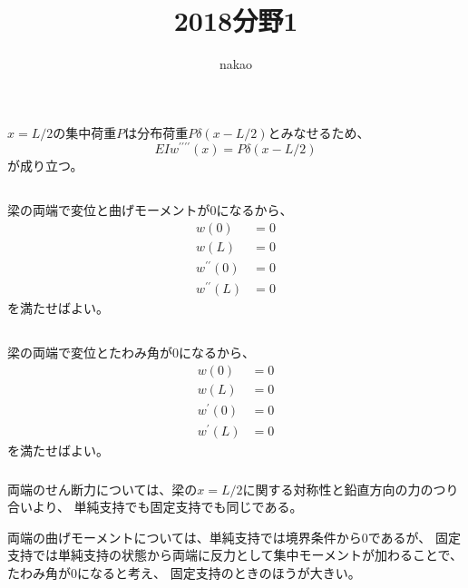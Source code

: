 \documentclass[a4paper]{jsarticle}
\begin{document}
\title{2018分野1}
\author{nakao}
\maketitle

\section{}
\subsection{}
$x = L/2$の集中荷重$P$は分布荷重$P \delta (x - L/2)$とみなせるため、
\begin{equation}
  E I w^{\prime \prime \prime \prime}(x) = P \delta (x - L/2)
\end{equation}
が成り立つ。

\subsection{}
梁の両端で変位と曲げモーメントが0になるから、
\begin{align}
  w(0)                 & = 0 \\
  w(L)                 & = 0 \\
  w^{\prime \prime}(0) & = 0 \\
  w^{\prime \prime}(L) & = 0
\end{align}
を満たせばよい。

\subsection{}
\subsubsection{}
梁の両端で変位とたわみ角が0になるから、
\begin{align}
  w(0)          & = 0 \\
  w(L)          & = 0 \\
  w^{\prime}(0) & = 0 \\
  w^{\prime}(L) & = 0
\end{align}
を満たせばよい。

\subsubsection{}
両端のせん断力については、梁の$x = L/2$に関する対称性と鉛直方向の力のつり合いより、
単純支持でも固定支持でも同じである。\par
両端の曲げモーメントについては、単純支持では境界条件から0であるが、
固定支持では単純支持の状態から両端に反力として集中モーメントが加わることで、たわみ角が0になると考え、
固定支持のときのほうが大きい。
\end{document}
